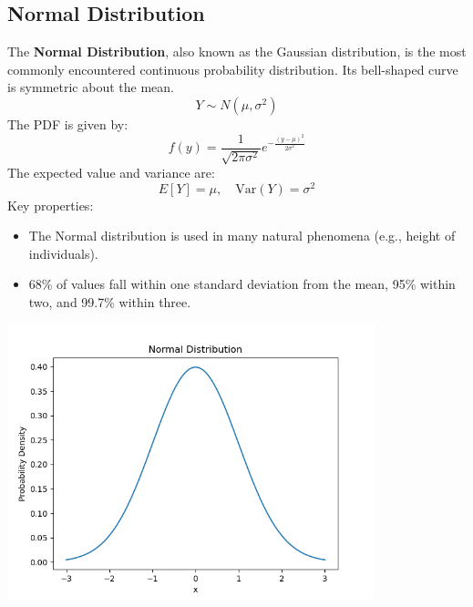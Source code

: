 \documentclass{article}
\begin{document}
\subsection{Normal Distribution}
The \textbf{Normal Distribution}, also known as the Gaussian distribution, is the most commonly encountered continuous probability distribution. Its bell-shaped curve is symmetric about the mean.
\[
Y \sim N(\mu, \sigma^2)
\]
The PDF is given by:
\[
f(y) = \frac{1}{\sqrt{2\pi\sigma^2}} e^{-\frac{{(y - \mu)}^2}{2\sigma^2}}
\]
The expected value and variance are:
\[
E[Y] = \mu, \quad \text{Var}(Y) = \sigma^2
\]
Key properties:
\begin{itemize}
    \item The Normal distribution is used in many natural phenomena (e.g., height of individuals).
    \item 68\% of values fall within one standard deviation from the mean, 95\% within two, and 99.7\% within three.
\end{itemize}
\begin{center}
    \includegraphics[width=0.8\textwidth]{./graphs/probDist/normal_distribution.png}
\end{center}

\newpage
\end{document}
